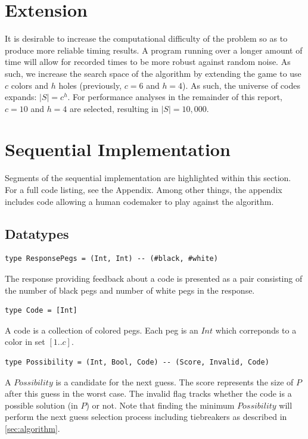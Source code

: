 \documentclass{article}
\begin{document}
\section{Extension}
It is desirable to increase the computational difficulty of the problem so as to produce more reliable timing results. A program running over a longer amount of time will allow for recorded times to be more robust against random noise. As such, we increase the search space of the algorithm by extending the game to use $c$ colors and $h$ holes (previously, $c=6$ and $h=4$). As such, the universe of codes expands: $|S| = c^h$. For performance analyses in the remainder of this report, $c=10$ and $h=4$ are selected, resulting in $|S| = 10,000$.

\section{Sequential Implementation}
Segments of the sequential implementation are highlighted within this section. For a full code listing, see the Appendix. %
Among other things, the appendix includes code allowing a human codemaker to play against the algorithm. 

\subsection{Datatypes}
\begin{verbatim}
type ResponsePegs = (Int, Int) -- (#black, #white)
\end{verbatim}
The response providing feedback about a code is presented as a pair consisting of the number of black pegs and number of white pegs in the response.

\begin{verbatim}
type Code = [Int]
\end{verbatim}
A code is a collection of colored pegs. Each peg is an $Int$ which correponds to a color in set $[1..c]$.

\begin{verbatim}
type Possibility = (Int, Bool, Code) -- (Score, Invalid, Code)
\end{verbatim}
A $Possibility$ is a candidate for the next guess. The score represents the size of $P$ after this guess in the worst case. The invalid flag tracks whether the code is a possible solution (in $P$) or not. Note that finding the minimum $Possibility$ will perform the next guess selection process including tiebreakers as described in \autoref{sec:algorithm}.
\end{document}
